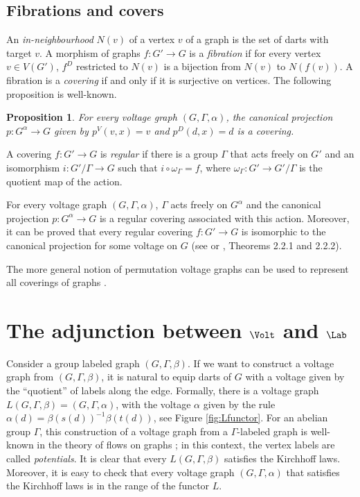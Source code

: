 \documentclass{amsart}
\newtheorem{proposition}[theorem]{Proposition}
\theoremstyle{definition}
\begin{document}
\subsection{Fibrations and covers}

An {\em in-neighbourhood} $N(v)$ of a vertex $v$ of a graph is the set
of darts with target $v$.
A morphism of graphs $f\colon G'\to G$ is a {\em fibration}
if for every vertex $v\in V(G')$,
$f^D$ restricted to $N(v)$
is a bijection from $N(v)$ to $N(f(v))$.
A fibration is a {\em covering} if and only if it is surjective on vertices.
The following proposition is well-known.

\begin{proposition}\label{prop:pisacovering}
For every voltage graph $(G,Γ,α)$, the canonical projection $p\colon G^α\to G$
given by $p^V(v,x)=v$ and $p^D(d,x)=d$ is a covering.
\end{proposition}

A covering $f\colon G'\to G$ is {\em regular} if there is a group 
$\Gamma$ that acts freely on $G'$ and an isomorphism 
$i\colon G'/\Gamma\to G$ such that $i\circ \omega_\Gamma=f$, where
$\omega_\Gamma\colon G'\to G'/\Gamma$ is the quotient map of the action.

For every voltage graph $(G,Γ,α)$, $Γ$ acts freely on $G^\alpha$ and the
canonical projection $p\colon G^α\to G$ is a regular covering associated with this
action. Moreover, it can be proved that every regular covering $f\colon G'\to
G$ is isomorphic to the canonical projection for some voltage
on $G$ (see \cite{gross1974voltage} or \cite{gross2001topological},
Theorems 2.2.1 and 2.2.2).

The more general notion of permutation voltage graphs can be used to represent
all coverings of graphs \cite{gross1977generating}.

\section{The adjunction between $\Volt$ and $\Lab$}


Consider a group labeled graph $(G,Γ,β)$. If we want to construct a voltage
graph from $(G,Γ,β)$, it is natural to equip darts of $G$ with a voltage given
by the ``quotient'' of labels along the edge. Formally, there is a voltage
graph $L(G,Γ,β)=(G,Γ,α)$, with the voltage $α$ given by the rule
$α(d)=β(s(d))^{-1}β(t(d))$, see Figure \ref{fig:Lfunctor}. For an abelian
group $Γ$, this construction of a voltage graph from a $Γ$-labeled graph is
well-known in the theory of flows on graphs \cite[Chapter II]{bollobas1998modern}; in this
context, the vertex labels are called {\em potentials}. It is clear that every
$L(G,Γ,β)$ satisfies the Kirchhoff laws. Moreover, it is easy to check that
every voltage graph $(G,Γ,α)$ that satisfies the Kirchhoff laws is in the range
of the functor $L$.
\end{document}
